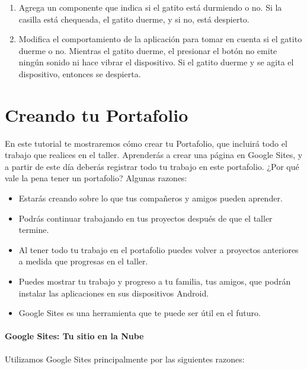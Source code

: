 \documentclass[letterpaper]{article}
\begin{document}
\begin{enumerate}

\item Agrega un componente  que
  indica si el gatito está durmiendo o no. Si la casilla está
  chequeada, el gatito duerme, y si no, está despierto.

\item Modifica el comportamiento de la aplicación para tomar en cuenta
  si el gatito duerme o no. Mientras el gatito duerme, el presionar el
  botón no emite ningún sonido ni hace vibrar el dispositivo. Si el
  gatito duerme y se agita el dispositivo, entonces se despierta.

\end{enumerate}


\section{Creando tu Portafolio}
\label{sec:creando-tu-port}

En este tutorial te mostraremos cómo crear tu Portafolio, que incluirá
todo el trabajo que realices en el taller. Aprenderás a crear una
página en Google Sites, y a partir de este día deberás registrar todo
tu trabajo en este portafolio. ¿Por qué vale la pena tener un
portafolio? Algunas razones:

\begin{itemize}
\item Estarás creando sobre lo que tus compañeros y amigos pueden aprender.

\item Podrás continuar trabajando en tus proyectos después de que el
  taller termine.

\item Al tener todo tu trabajo en el portafolio puedes volver a
  proyectos anteriores a medida que progresas en el taller.

\item Puedes mostrar tu trabajo y progreso a tu familia, tus amigos,
  que podrán instalar las aplicaciones en sus dispositivos Android.

\item Google Sites es una herramienta que te puede ser útil en el futuro.
\end{itemize}

\paragraph{Google Sites: Tu sitio en la Nube} Utilizamos Google Sites
principalmente por las siguientes razones:
\end{document}
